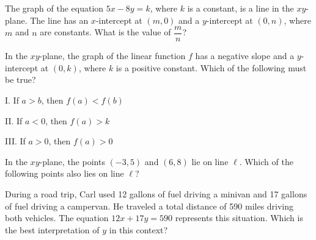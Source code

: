 The graph of the equation $5x - 8y = k$, where $k$ is a constant, is a line in the $xy$-plane. The line has an $x$-intercept at $(m, 0)$ and a $y$-intercept at $(0, n)$, where $m$ and $n$ are constants. What is the value of $\dfrac{m}{n}$?

\vspace{0.75em}


\vspace{2em}

\noindent\markforreview
\vspace{1em}

In the $xy$-plane, the graph of the linear function $f$ has a negative slope and a $y$-intercept at $(0, k)$, where $k$ is a positive constant. Which of the following must be true?

\vspace{0.5em}

I. If $a > b$, then $f(a) < f(b)$

II. If $a < 0$, then $f(a) > k$

III. If $a > 0$, then $f(a) > 0$

\vspace{0.75em}


\vspace{2em}

\noindent\markforreview
\vspace{1em}

In the $xy$-plane, the points $(-3, 5)$ and $(6, 8)$ lie on line $\ell$. Which of the following points also lies on line $\ell$?

\vspace{0.75em}


\vspace{2em}

\noindent\markforreview
\vspace{1em}

During a road trip, Carl used 12 gallons of fuel driving a minivan and 17 gallons of fuel driving a campervan. He traveled a total distance of 590 miles driving both vehicles. The equation $12x + 17y = 590$ represents this situation. Which is the best interpretation of $y$ in this context?

